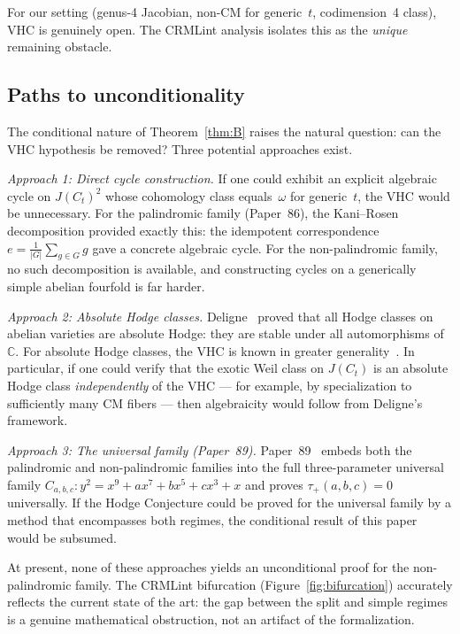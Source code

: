 \documentclass[11pt]{article}
\theoremstyle{plain}
\theoremstyle{definition}
\theoremstyle{remark}
\newcommand{\C}{\mathbb{C}}
\begin{document}
For our setting (genus-4 Jacobian, non-CM for generic~$t$,
codimension~4 class), VHC is genuinely open.  The CRMLint analysis
isolates this as the \emph{unique} remaining obstacle.

\subsection{Paths to unconditionality}

The conditional nature of Theorem~\ref{thm:B} raises the
natural question: can the VHC hypothesis be removed?
Three potential approaches exist.

\emph{Approach 1: Direct cycle construction.}
If one could exhibit an explicit algebraic cycle on
$J(C_t)^2$ whose cohomology class equals~$\omega$ for
generic~$t$, the VHC would be unnecessary.  For the
palindromic family (Paper~86), the Kani--Rosen decomposition
provided exactly this: the idempotent correspondence
$e = \tfrac{1}{|G|}{\sum_{g \in G}} g$ gave a concrete
algebraic cycle.  For the non-palindromic family, no such
decomposition is available, and constructing cycles on a
generically simple abelian fourfold is far harder.

\emph{Approach 2: Absolute Hodge classes.}
Deligne~\cite{Deligne82} proved that all Hodge classes on
abelian varieties are absolute Hodge: they are stable under
all automorphisms of~$\C$.  For absolute Hodge classes, the
VHC is known in greater generality~\cite{Voisin07}.
In particular, if one could verify that the exotic Weil class
on $J(C_t)$ is an absolute Hodge class \emph{independently} of
the VHC --- for example, by specialization to sufficiently many
CM fibers --- then algebraicity would follow from Deligne's
framework.

\emph{Approach 3: The universal family (Paper~89).}
Paper~89~\cite{P89} embeds both the palindromic and
non-palindromic families into the full three-parameter
universal family $C_{a,b,c}\colon y^2 = x^9 + ax^7 + bx^5 +
cx^3 + x$ and proves $\tau_+(a,b,c) = 0$ universally.
If the Hodge Conjecture could be proved for the universal
family by a method that encompasses both regimes, the
conditional result of this paper would be subsumed.

At present, none of these approaches yields an unconditional
proof for the non-palindromic family.  The CRMLint bifurcation
(Figure~\ref{fig:bifurcation}) accurately reflects the current
state of the art: the gap between the split and simple regimes
is a genuine mathematical obstruction, not an artifact of
the formalization.
\end{document}
